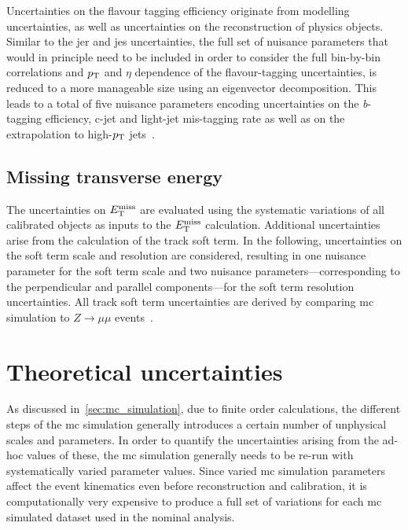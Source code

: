  Uncertainties on the flavour tagging efficiency originate from \eg modelling uncertainties, as well as uncertainties on the reconstruction of physics objects.
 Similar to the \gls{jer} and \gls{jes} uncertainties, the full set of nuisance parameters that would in principle need to be included in order to consider the full bin-by-bin correlations and $p_{\textrm{T}}$ and $\eta$ dependence of the flavour-tagging uncertainties, is reduced to a more manageable size using an eigenvector decomposition.
 This leads to a total of five nuisance parameters encoding uncertainties on the \textit{b}-tagging efficiency, c-jet and light-jet mis-tagging rate as well as on the extrapolation to high-$p_{\textrm{T}}$ jets~\cite{FTAG-2018-01, PERF-2016-05}.  
 
\subsection{Missing transverse energy}

The uncertainties on $E_{\textrm{T}}^{\textrm{miss}}$ are evaluated using the systematic variations of all calibrated objects as inputs to the $E_{\textrm{T}}^{\textrm{miss}}$ calculation.
Additional uncertainties arise from the calculation of the track soft term.
In the following, uncertainties on the soft term scale and resolution are considered, resulting in one nuisance parameter for the soft term scale and two nuisance parameters---corresponding to the perpendicular and parallel components---for the soft term resolution uncertainties.
All track soft term uncertainties are derived by comparing \gls{mc} simulation to $Z\rightarrow\mu\mu$ events~\cite{PERF-2016-07}. 

\section{Theoretical uncertainties}

As discussed in~\cref{sec:mc_simulation}, due to finite order calculations, the different steps of the \gls{mc} simulation generally introduces a certain number of unphysical scales and parameters.
In order to quantify the uncertainties arising from the ad-hoc values of these, the \gls{mc} simulation generally needs to be re-run with systematically varied parameter values.
Since varied \gls{mc} simulation parameters affect the event kinematics even before reconstruction and calibration, it is computationally very expensive to produce a full set of variations for each \gls{mc} simulated dataset used in the nominal analysis.

